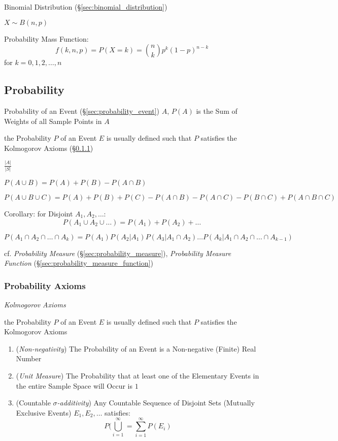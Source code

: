 Binomial Distribution (\S\ref{sec:binomial_distribution})

$X \sim B(n,p)$

Probability Mass Function:
\[
  f(k,n,p) = P(X = k) = \binom{n}{k} p^k (1-p)^{n-k}
\]
for $k = 0,1,2, \ldots, n$



\subsection{Probability}\label{sec:probability}

Probability of an Event (\S\ref{sec:probability_event}) $A$, $P(A)$ is the Sum
of Weights of all Sample Points in $A$

the Probability $P$ of an Event $E$ is usually defined such that $P$ satisfies
the Kolmogorov Axioms (\S\ref{sec:probability_axioms})

$\frac{|A|}{|S|}$

$P(A \cup B) = P(A) + P(B) - P(A \cap B)$

$P(A \cup B \cup C) = P(A) + P(B) + P(C) - P(A \cap B) - P(A \cap C) -
P(B \cap C) + P(A \cap B \cap C)$

Corollary: for Disjoint $A_1, A_2, \ldots$:
\[
  P(A_1 \cup A_2 \cup \ldots) = P(A_1) + P(A_2) + \ldots
\]

$P(A_1 \cap A_2 \cap \ldots \cap A_k) = P(A_1) P(A_2 | A_1) P(A_3 |
A_1 \cap A_2) \ldots P(A_k | A_1 \cap A_2 \cap \ldots \cap A_{k-1})$

cf. \emph{Probability Measure} (\S\ref{sec:probability_measure}),
\emph{Probability Measure Function} (\S\ref{sec:probability_measure_function})



\subsubsection{Probability Axioms}\label{sec:probability_axioms}

\emph{Kolmogorov Axioms}

the Probability $P$ of an Event $E$ is usually defined such that $P$ satisfies
the Kolmogorov Axioms

\begin{enumerate}
  \item (\emph{Non-negativity}) The Probability of an Event is a Non-negative
    (Finite) Real Number
  \item (\emph{Unit Measure}) The Probability that at least one of the
    Elementary Events in the entire Sample Space will Occur is $1$
  \item (Countable \emph{$\sigma$-additivity}) Any Countable Sequence of
    Disjoint Sets (Mutually Exclusive Events) $E_1, E_2, \ldots$ satisfies:
    \[
      P (\bigcup_{i=1}^\infty = \sum_{i=1}^\infty P(E_i)
    \]
\end{enumerate}


